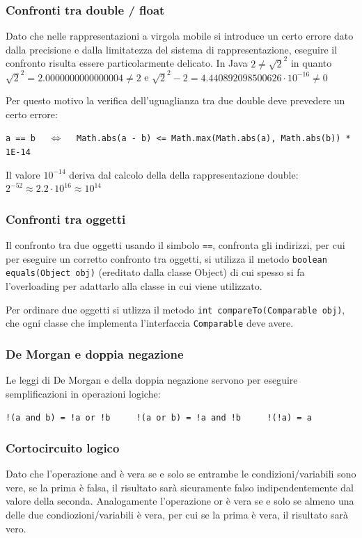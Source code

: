 \documentclass{article}
\begin{document}
\subsubsection*{Confronti tra double / float}
Dato che nelle rappresentazioni a virgola mobile si introduce un certo errore dato dalla precisione e dalla limitatezza del
sistema di rappresentazione, eseguire il confronto risulta essere particolarmente delicato.
In Java \(2 \neq \sqrt{2}^2\) in quanto \(\sqrt{2}^2 = 2.0000000000000004 \neq 2\) e \(\sqrt{2}^2-2 = 4.440892098500626 \cdot 10^{-16} \neq 0\)

Per questo motivo la verifica dell'uguaglianza tra due double deve prevedere un certo errore:
\begin{center}
	\verb|a == b| \(\quad \Leftrightarrow \quad\) \verb|Math.abs(a - b) <= Math.max(Math.abs(a), Math.abs(b)) * 1E-14|
\end{center}

Il valore \(10^{-14}\) deriva dal calcolo della  della rappresentazione double: \(2^{-52} \approx 2.2 \cdot 10^{16} \approx 10^{14}\)

\subsubsection*{Confronti tra oggetti}
Il confronto tra due oggetti usando il simbolo \verb|==|, confronta gli indirizzi, per cui per eseguire un corretto confronto tra
oggetti, si utilizza il metodo \verb|boolean equals(Object obj)| (ereditato dalla classe Object) di cui spesso si fa l'overloading
per adattarlo alla classe in cui viene utilizzato.

Per ordinare due oggetti si utlizza il metodo \verb|int compareTo(Comparable obj)|, che ogni classe che implementa l'interfaccia
\verb|Comparable| deve avere.

\subsubsection*{De Morgan e doppia negazione}
Le leggi di De Morgan e della doppia negazione servono per eseguire semplificazioni in operazioni logiche:
\begin{center}
	\verb|!(a and b) = !a or !b| \(\qquad\) \verb|!(a or b) = !a and !b| \(\qquad\) \verb|!(!a) = a|
\end{center}

\subsubsection*{Cortocircuito logico}
Dato che l'operazione and è vera se e solo se entrambe le condizioni/variabili sono vere, se la prima è falsa, il risultato sarà
sicuramente falso indipendentemente dal valore della seconda. Analogamente l'operazione or è vera se e solo se almeno una delle
due condiozioni/variabili è vera, per cui se la prima è vera, il risultato sarà vero.
\end{document}
